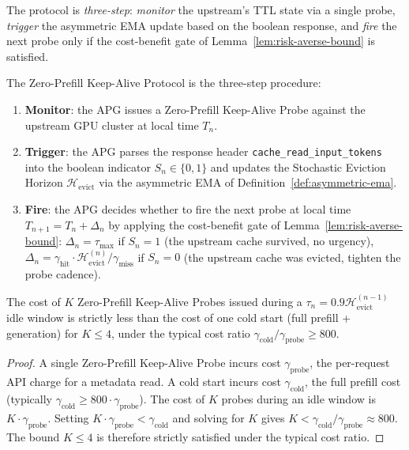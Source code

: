 The protocol is \emph{three-step}: \emph{monitor} the upstream's TTL
state via a single probe, \emph{trigger} the asymmetric EMA update
based on the boolean response, and \emph{fire} the next probe only if
the cost-benefit gate of Lemma~\ref{lem:risk-averse-bound} is
satisfied.

\begin{definition}
\label{def:protocol}
The Zero-Prefill Keep-Alive Protocol is the three-step procedure:
\begin{enumerate}
\item \textbf{Monitor}: the APG issues a Zero-Prefill Keep-Alive Probe
against the upstream GPU cluster at local time $T_n$.
\item \textbf{Trigger}: the APG parses the response header
\texttt{cache\_read\_input\_tokens} into the boolean indicator
$S_n \in \{0, 1\}$ and updates the Stochastic Eviction Horizon
$\mathcal{H}_{\text{evict}}$ via the asymmetric EMA of
Definition~\ref{def:asymmetric-ema}.
\item \textbf{Fire}: the APG decides whether to fire the next probe
at local time $T_{n+1} = T_n + \Delta_n$ by applying the cost-benefit
gate of Lemma~\ref{lem:risk-averse-bound}:
$\Delta_n = \tau_{\max}$ if $S_n = 1$ (the upstream cache survived,
no urgency), $\Delta_n = \gamma_{\text{hit}} \cdot
\mathcal{H}_{\text{evict}}^{(n)} / \gamma_{\text{miss}}$ if $S_n = 0$
(the upstream cache was evicted, tighten the probe cadence).
\end{enumerate}
\end{definition}

\begin{lemma}
\label{lem:cost-amortization}
The cost of $K$ Zero-Prefill Keep-Alive Probes issued during a
$\tau_n = 0.9 \mathcal{H}_{\text{evict}}^{(n-1)}$ idle window is
strictly less than the cost of one cold start (full prefill +
generation) for $K \le 4$, under the typical cost ratio
$\gamma_{\text{cold}} / \gamma_{\text{probe}} \ge 800$.
\end{lemma}

\begin{proof}
A single Zero-Prefill Keep-Alive Probe incurs cost $\gamma_{\text{probe}}$,
the per-request API charge for a metadata read. A cold start incurs
cost $\gamma_{\text{cold}}$, the full prefill cost (typically
$\gamma_{\text{cold}} \ge 800 \cdot \gamma_{\text{probe}}$). The cost
of $K$ probes during an idle window is $K \cdot \gamma_{\text{probe}}$.
Setting $K \cdot \gamma_{\text{probe}} < \gamma_{\text{cold}}$ and
solving for $K$ gives $K < \gamma_{\text{cold}} / \gamma_{\text{probe}}
\approx 800$. The bound $K \le 4$ is therefore strictly satisfied
under the typical cost ratio. \qedhere
\end{proof}

